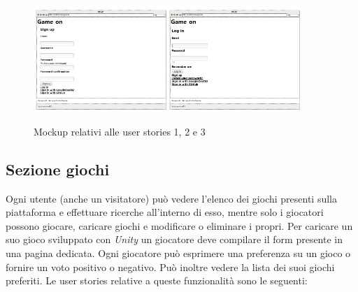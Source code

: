 \begin{figure}[h!]
\centering
\includegraphics[width=0.45\textwidth]{mockup_registration}\includegraphics[width=0.45\textwidth]{mockup_login}
\caption{Mockup relativi alle user stories 1, 2 e 3}
\end{figure}

\subsection{Sezione giochi}

Ogni utente (anche un visitatore) può vedere l'elenco dei giochi presenti sulla piattaforma e effettuare ricerche all'interno di esso, mentre solo i giocatori possono giocare, caricare giochi e modificare o eliminare i propri. Per caricare un suo gioco sviluppato con \textit{Unity} un giocatore deve compilare il form presente in una pagina dedicata. Ogni giocatore può esprimere una preferenza su un gioco o fornire un voto positivo o negativo. Può inoltre vedere la lista dei suoi giochi preferiti.
\newline
Le user stories relative a queste funzionalità sono le seguenti:

